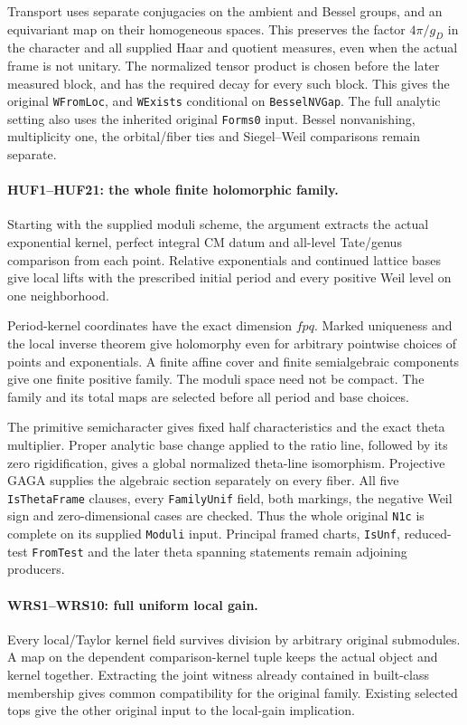 Transport uses separate conjugacies on the ambient and Bessel groups,
and an equivariant map on their homogeneous spaces. This preserves
the factor \(4\pi/g_D\) in the character and all supplied Haar
and quotient measures, even when the actual frame is not unitary.
The normalized tensor product is chosen before the later measured
block, and has the required decay for every such block. This gives
the original \texttt{WFromLoc}, and \texttt{WExists} conditional
on \texttt{BesselNVGap}. The full analytic setting also uses the
inherited original \texttt{Forms0} input. Bessel nonvanishing,
multiplicity one, the orbital/fiber ties and Siegel--Weil comparisons
remain separate.

\paragraph{HUF1--HUF21: the whole finite holomorphic family.}
Starting with the supplied moduli scheme, the argument extracts the
actual exponential kernel, perfect integral CM datum and all-level
Tate/genus comparison from each point. Relative exponentials and
continued lattice bases give local lifts with the prescribed initial
period and every positive Weil level on one neighborhood.

Period-kernel coordinates have the exact dimension \(fpq\).
Marked uniqueness and the local inverse theorem give holomorphy even
for arbitrary pointwise choices of points and exponentials. A finite
affine cover and finite semialgebraic components give one finite
positive family. The moduli space need not be compact. The family
and its total maps are selected before all period and base choices.

The primitive semicharacter gives fixed half characteristics and the
exact theta multiplier. Proper analytic base change applied to the
ratio line, followed by its zero rigidification, gives a global
normalized theta-line isomorphism. Projective GAGA supplies the
algebraic section separately on every fiber. All five
\texttt{IsThetaFrame} clauses, every \texttt{FamilyUnif} field,
both markings, the negative Weil sign and zero-dimensional cases
are checked. Thus the whole original \texttt{N1c} is complete
on its supplied \texttt{Moduli} input. Principal framed charts,
\texttt{IsUnf}, reduced-test \texttt{FromTest} and the later theta
spanning statements remain adjoining producers.

\paragraph{WRS1--WRS10: full uniform local gain.}
Every local/Taylor kernel field survives division by arbitrary
original submodules. A map on the dependent comparison-kernel tuple
keeps the actual object and kernel together. Extracting the joint
witness already contained in built-class membership gives common
compatibility for the original family. Existing selected tops give
the other original input to the local-gain implication.

